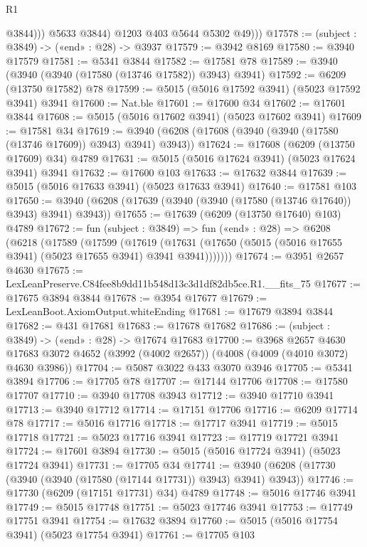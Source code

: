 \begin{lexlean}{R1}
\begin{coremodule}
                  @3844)))
            @5633
            @3844)
          @1203
          @403
          @5644
          @5302
          @49)))
@17578 := (subject : @3849) -> («end» : @28) -> @3937
@17579 := @3942 @8169
@17580 := @3940 @17579
@17581 := @5341 @3844
@17582 := @17581 @78
@17589 := @3940 (@3940 (@3940 (@17580 (@13746 @17582)) @3943) @3941)
@17592 := @6209 (@13750 @17582) @78
@17599 := @5015 (@5016 @17592 @3941) (@5023 @17592 @3941) @3941
@17600 := Nat.ble
@17601 := @17600 @34
@17602 := @17601 @3844
@17608 := @5015 (@5016 @17602 @3941) (@5023 @17602 @3941)
@17609 := @17581 @34
@17619 := @3940 (@6208 (@17608 (@3940 (@3940 (@17580 (@13746 @17609)) @3943) @3941) @3943))
@17624 := @17608 (@6209 (@13750 @17609) @34) @4789
@17631 := @5015 (@5016 @17624 @3941) (@5023 @17624 @3941) @3941
@17632 := @17600 @103
@17633 := @17632 @3844
@17639 := @5015 (@5016 @17633 @3941) (@5023 @17633 @3941)
@17640 := @17581 @103
@17650 := @3940 (@6208 (@17639 (@3940 (@3940 (@17580 (@13746 @17640)) @3943) @3941) @3943))
@17655 := @17639 (@6209 (@13750 @17640) @103) @4789
@17672 := fun (subject : @3849) =>
  fun («end» : @28) =>
  @6208
    (@6218
      (@17589
        (@17599
          (@17619
            (@17631 (@17650 (@5015 (@5016 @17655 @3941) (@5023 @17655 @3941) @3941 @3941)))))))
@17674 := @3951 @2657 @4630
@17675 := LexLeanPreserve.C84fee8b9dd11b548d13c3d1df82db5ce.R1.__fits_75
@17677 := @17675 @3894 @3844
@17678 := @3954 @17677
@17679 := LexLeanBoot.AxiomOutput.whiteEnding
@17681 := @17679 @3894 @3844
@17682 := @431 @17681
@17683 := @17678 @17682
@17686 := (subject : @3849) -> («end» : @28) -> @17674 @17683
@17700 := @3968
    @2657
    @4630
    @17683
    @3072
    @4652
    (@3992 (@4002 @2657))
    (@4008 (@4009 (@4010 @3072) @4630 @3986))
@17704 := @5087 @3022 @433 @3070 @3946
@17705 := @5341 @3894
@17706 := @17705 @78
@17707 := @17144 @17706
@17708 := @17580 @17707
@17710 := @3940 @17708 @3943
@17712 := @3940 @17710 @3941
@17713 := @3940 @17712
@17714 := @17151 @17706
@17716 := @6209 @17714 @78
@17717 := @5016 @17716
@17718 := @17717 @3941
@17719 := @5015 @17718
@17721 := @5023 @17716 @3941
@17723 := @17719 @17721 @3941
@17724 := @17601 @3894
@17730 := @5015 (@5016 @17724 @3941) (@5023 @17724 @3941)
@17731 := @17705 @34
@17741 := @3940 (@6208 (@17730 (@3940 (@3940 (@17580 (@17144 @17731)) @3943) @3941) @3943))
@17746 := @17730 (@6209 (@17151 @17731) @34) @4789
@17748 := @5016 @17746 @3941
@17749 := @5015 @17748
@17751 := @5023 @17746 @3941
@17753 := @17749 @17751 @3941
@17754 := @17632 @3894
@17760 := @5015 (@5016 @17754 @3941) (@5023 @17754 @3941)
@17761 := @17705 @103

\end{coremodule}
\end{lexlean}
